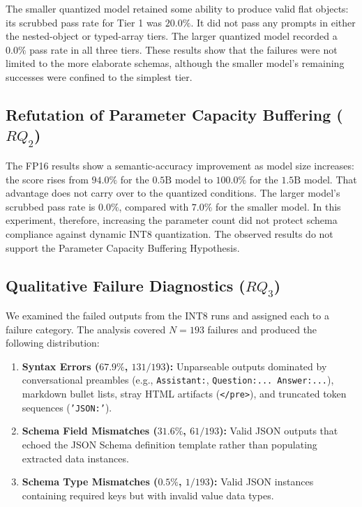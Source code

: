 \documentclass[10pt, conference, a4paper]{IEEEtran}
\begin{document}
The smaller quantized model retained some ability to produce valid flat objects: its scrubbed pass rate for Tier 1 was $20.0\%$. It did not pass any prompts in either the nested-object or typed-array tiers. The larger quantized model recorded a $0.0\%$ pass rate in all three tiers. These results show that the failures were not limited to the more elaborate schemas, although the smaller model's remaining successes were confined to the simplest tier.

\subsection{Refutation of Parameter Capacity Buffering ($RQ_2$)}
The FP16 results show a semantic-accuracy improvement as model size increases: the score rises from $94.0\%$ for the $0.5\text{B}$ model to $100.0\%$ for the $1.5\text{B}$ model. That advantage does not carry over to the quantized conditions. The larger model's scrubbed pass rate is $0.0\%$, compared with $7.0\%$ for the smaller model. In this experiment, therefore, increasing the parameter count did not protect schema compliance against dynamic $\text{INT8}$ quantization. The observed results do not support the Parameter Capacity Buffering Hypothesis.

\subsection{Qualitative Failure Diagnostics ($RQ_3$)}
We examined the failed outputs from the $\text{INT8}$ runs and assigned each to a failure category. The analysis covered $N=193$ failures and produced the following distribution:
\begin{enumerate}
    \item \textbf{Syntax Errors ($67.9\%$, $131/193$):} Unparseable outputs dominated by conversational preambles (e.g., \texttt{Assistant:}, \texttt{Question:... Answer:...}), markdown bullet lists, stray HTML artifacts (\texttt{</pre>}), and truncated token sequences (\texttt{'JSON:'}).
    \item \textbf{Schema Field Mismatches ($31.6\%$, $61/193$):} Valid JSON outputs that echoed the JSON Schema definition template rather than populating extracted data instances.
    \item \textbf{Schema Type Mismatches ($0.5\%$, $1/193$):} Valid JSON instances containing required keys but with invalid value data types.
\end{enumerate}
\end{document}
